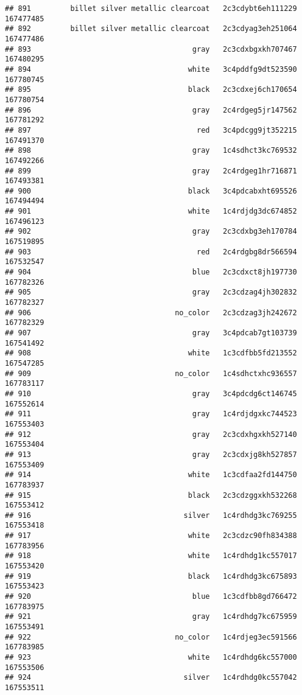 \documentclass[
]{article}
\begin{document}
\begin{verbatim}
## 891         billet silver metallic clearcoat   2c3cdybt6eh111229 167477485
## 892         billet silver metallic clearcoat   2c3cdyag3eh251064 167477486
## 893                                     gray   2c3cdxbgxkh707467 167480295
## 894                                    white   3c4pddfg9dt523590 167780745
## 895                                    black   2c3cdxej6ch170654 167780754
## 896                                     gray   2c4rdgeg5jr147562 167781292
## 897                                      red   3c4pdcgg9jt352215 167491370
## 898                                     gray   1c4sdhct3kc769532 167492266
## 899                                     gray   2c4rdgeg1hr716871 167493381
## 900                                    black   3c4pdcabxht695526 167494494
## 901                                    white   1c4rdjdg3dc674852 167496123
## 902                                     gray   2c3cdxbg3eh170784 167519895
## 903                                      red   2c4rdgbg8dr566594 167532547
## 904                                     blue   2c3cdxct8jh197730 167782326
## 905                                     gray   2c3cdzag4jh302832 167782327
## 906                                 no_color   2c3cdzag3jh242672 167782329
## 907                                     gray   3c4pdcab7gt103739 167541492
## 908                                    white   1c3cdfbb5fd213552 167547285
## 909                                 no_color   1c4sdhctxhc936557 167783117
## 910                                     gray   3c4pdcdg6ct146745 167552614
## 911                                     gray   1c4rdjdgxkc744523 167553403
## 912                                     gray   2c3cdxhgxkh527140 167553404
## 913                                     gray   2c3cdxjg8kh527857 167553409
## 914                                    white   1c3cdfaa2fd144750 167783937
## 915                                    black   2c3cdzggxkh532268 167553412
## 916                                   silver   1c4rdhdg3kc769255 167553418
## 917                                    white   2c3cdzc90fh834388 167783956
## 918                                    white   1c4rdhdg1kc557017 167553420
## 919                                    black   1c4rdhdg3kc675893 167553423
## 920                                     blue   1c3cdfbb8gd766472 167783975
## 921                                     gray   1c4rdhdg7kc675959 167553491
## 922                                 no_color   1c4rdjeg3ec591566 167783985
## 923                                    white   1c4rdhdg6kc557000 167553506
## 924                                   silver   1c4rdhdg0kc557042 167553511

\end{verbatim}
\end{document}
